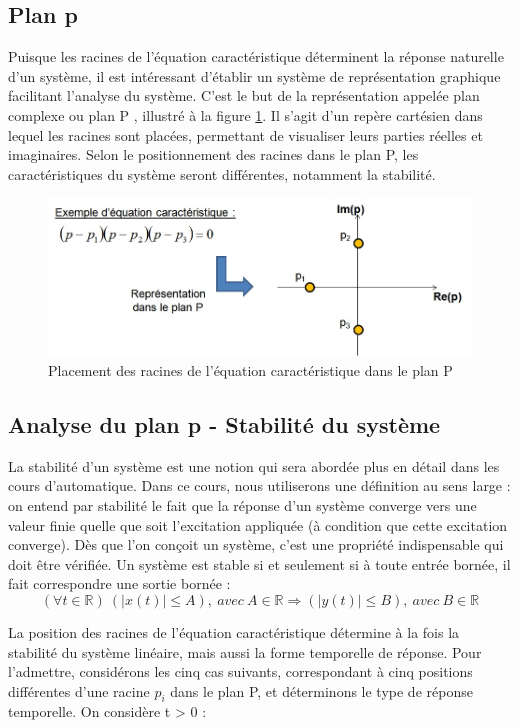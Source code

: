 \documentclass[]{report}
\begin{document}
	\subsection{Plan p}
	Puisque les racines de l'équation caractéristique déterminent la réponse naturelle d'un système, il est intéressant d'établir un système de représentation graphique facilitant l'analyse du système. C'est le but de la représentation appelée plan complexe ou plan P , illustré à la figure \ref{Fig:Plan_P}. Il s'agit d'un repère cartésien dans lequel les racines sont placées, permettant de visualiser leurs parties réelles et imaginaires. Selon le positionnement des racines dans le plan P, les caractéristiques du système seront différentes, notamment la stabilité.
	\begin{figure}[h!]
		\centering
		\includegraphics[scale=0.5]{images/Plan_P.jpg} 
		\caption{Placement des racines de l'équation caractéristique dans le plan P}	
		\label{Fig:Plan_P}
	\end{figure}

	\subsection{Analyse du plan p - Stabilité du système}
	La stabilité d'un système est une notion qui sera abordée plus en détail dans les cours d'automatique. Dans ce cours, nous utiliserons une définition au sens large : on entend par stabilité le fait que la réponse d'un système converge vers une valeur finie quelle que soit l'excitation appliquée (à condition que cette excitation converge). Dès que l'on conçoit un système, c'est une propriété indispensable qui doit être vérifiée.
	Un système est stable si et seulement si à toute entrée bornée, il fait correspondre une sortie bornée :
	\begin{equation}
	(\forall t \in \mathbb{R})~(|x(t)| \leq A),~avec~A \in \mathbb{R} \Rightarrow (|y(t)| \leq B),~avec~B \in \mathbb{R}
	\end{equation}
	
	
	La position des racines de l'équation caractéristique détermine à la fois la stabilité du système linéaire, mais aussi la forme temporelle de réponse. Pour l'admettre, considérons les cinq cas suivants, correspondant à cinq positions différentes d'une racine $p_{i}$ dans le plan P, et déterminons le type de réponse temporelle. On considère t > 0 :
	
\end{document}
